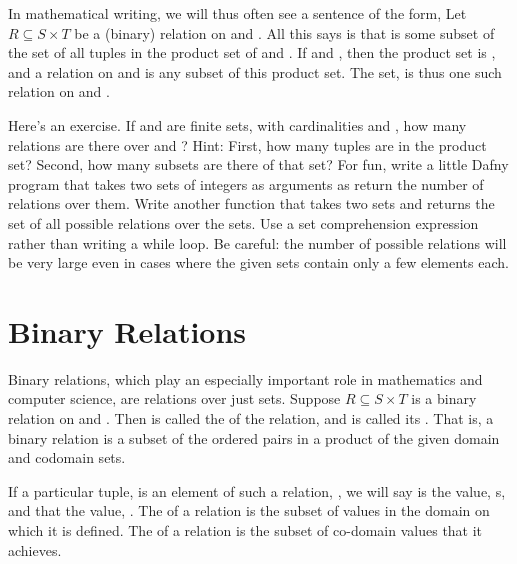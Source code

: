 \documentclass[letterpaper,10pt,english]{sphinxmanual}
\begin{document}
In mathematical writing, we will thus often see a sentence of the
form, Let \(R \subseteq S \times T\) be a (binary) relation on 
and . All this says is that  is some subset of the set of all
tuples in the product set of  and . If  and
, then the product set is , and a relation on  and  is any
subset of this product set.  The set,  is
thus one such relation on  and .

Here’s an exercise. If  and  are finite sets, with cardinalities
 and , how many relations are there over  and
? Hint: First, how many tuples are in the product set? Second, how
many subsets are there of that set? For fun, write a little Dafny
program that takes two sets of integers as arguments as return the
number of relations over them.  Write another function that takes two
sets and returns the set of all possible relations over the sets. Use
a set comprehension expression rather than writing a while loop. Be
careful: the number of possible relations will be very large even in
cases where the given sets contain only a few elements each.


\section{Binary Relations}
\label{\detokenize{07-set-theory:binary-relations}}
Binary relations, which play an especially important role in
mathematics and computer science, are relations over just 
sets. Suppose \(R \subseteq S \times T\) is a binary relation on
 and . Then  is called the  of the relation, and 
is called its . That is, a binary relation is a subset of
the ordered pairs in a product of the given domain and codomain sets.

If a particular tuple,  is an element of such a relation, ,
we will say  is  the value, s, and that 
the value, . The  of a relation is the subset of values in
the domain on which it is defined. The  of a relation is the
subset of co-domain values that it achieves.
\end{document}
